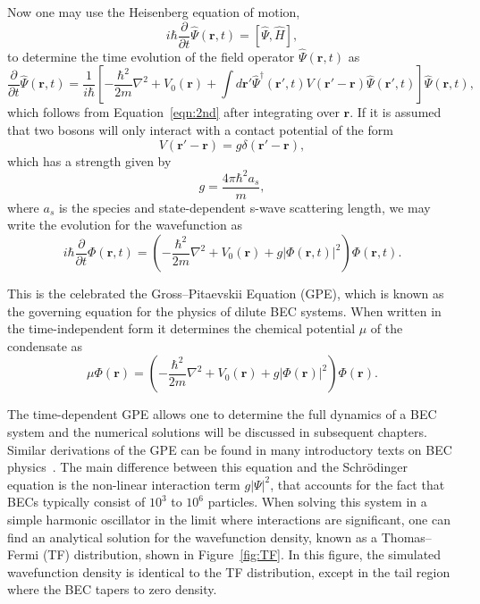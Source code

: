 Now one may use the Heisenberg equation of motion,
\begin{equation}
    i\hbar \frac{\partial}{\partial t}\hat \Psi(\mathbf{r},t) = [\hat \Psi, \hat H],
\end{equation}
    to determine the time evolution of the field operator $\hat \Psi(\mathbf{r},t)$ as
\begin{equation}
    \frac{\partial}{\partial t}\hat \Psi(\mathbf{r},t) = \frac{1}{i\hbar}\left[-\frac{\hbar^2}{2m}\nabla^2 + V_0(\mathbf{r}) + \int d\mathbf{r'} \hat \Psi^\dagger(\mathbf{r'}, t)V(\mathbf{r'} -\mathbf{r})\hat \Psi(\mathbf{r'},t)\right]\hat \Psi(\mathbf{r},t),
\end{equation}
which follows from Equation~\eqref{eqn:2nd} after integrating over $\mathbf{r}$.
If it is assumed that two bosons will only interact with a contact potential of the form
\begin{equation}
V(\mathbf{r'}-\mathbf{r}) = g\delta(\mathbf{r'} - \mathbf{r}),
\end{equation}
which has a strength given by
\begin{equation}
g = \frac{4 \pi \hbar^2 a_s}{m},
\end{equation}
where $a_s$ is the species and state-dependent s-wave scattering length,
we may write the evolution for the wavefunction as
\begin{equation}
    i\hbar \frac{\partial}{\partial t}\Phi(\mathbf{r},t) = \left( - \frac{\hbar^2}{2m} \nabla^2 + V_0(\mathbf{r}) + g |\Phi(\mathbf{r},t)|^2\right)\Phi(\mathbf{r},t).
\end{equation}

\noindent This is the celebrated the Gross--Pitaevskii Equation (GPE), which is known as the governing equation for the physics of dilute BEC systems.
When written in the time-independent form it determines the chemical potential $\mu$ of the condensate as~\cite{gross1961, pitaevskii1961}
\begin{equation}
    \mu\Phi(\mathbf{r}) = \left( - \frac{\hbar^2}{2m} \nabla^2 + V_0(\mathbf{r}) + g |\Phi(\mathbf{r})|^2\right)\Phi(\mathbf{r}).
    \label{eqn:GP}
\end{equation}

The time-dependent GPE allows one to determine the full dynamics of a BEC system and the numerical solutions will be discussed in subsequent chapters.
Similar derivations of the GPE can be found in many introductory texts on BEC physics~\cite{fetter2003, pethick2002, fetter2009}.
The main difference between this equation and the Schr\"odinger equation is the non-linear interaction term $g|\Psi|^2$, that accounts for the fact that BECs typically consist of $10^3$ to $10^6$ particles.
When solving this system in a simple harmonic oscillator in the limit where interactions are significant, one can find an analytical solution for the wavefunction density, known as a Thomas--Fermi (TF) distribution, shown in Figure~\ref{fig:TF}.
In this figure, the simulated wavefunction density is identical to the TF distribution, except in the tail region where the BEC tapers to zero density.

